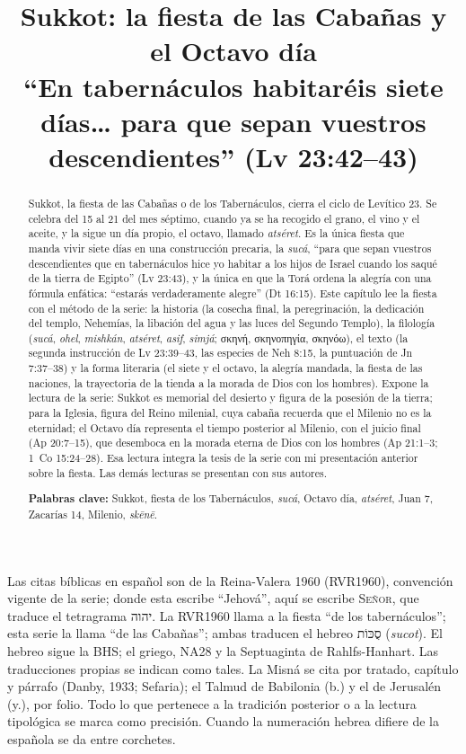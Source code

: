 \documentclass[11pt,letterpaper]{article}
\title{\color{tierraroja}\bfseries Sukkot: la fiesta de las Cabañas y el Octavo día\\[4pt]\large\color{sepia}\mdseries ``En tabernáculos habitaréis siete días\ldots{} para que sepan vuestros descendientes'' (Lv 23:42--43)}
\author{}\date{}
\newcommand{\heb}[1]{\mbox{\foreignlanguage{hebrew}{#1}}}
\newcommand{\grc}[1]{\foreignlanguage{ancientgreek}{#1}}
\newcommand{\SENOR}{\textsc{Señor}}
\begin{document}
\maketitle\thispagestyle{empty}

\begin{abstract}\noindent
Sukkot, la fiesta de las Cabañas o de los Tabernáculos, cierra el ciclo de Levítico 23. Se celebra del 15 al 21 del mes séptimo, cuando ya se ha recogido el grano, el vino y el aceite, y la sigue un día propio, el octavo, llamado \emph{atséret}. Es la única fiesta que manda vivir siete días en una construcción precaria, la \emph{sucá}, ``para que sepan vuestros descendientes que en tabernáculos hice yo habitar a los hijos de Israel cuando los saqué de la tierra de Egipto'' (Lv 23:43), y la única en que la Torá ordena la alegría con una fórmula enfática: ``estarás verdaderamente alegre'' (Dt 16:15). Este capítulo lee la fiesta con el método de la serie: la historia (la cosecha final, la peregrinación, la dedicación del templo, Nehemías, la libación del agua y las luces del Segundo Templo), la filología (\emph{sucá}, \emph{ohel}, \emph{mishkán}, \emph{atséret}, \emph{asif}, \emph{simjá}; \grc{σκηνή}, \grc{σκηνοπηγία}, \grc{σκηνόω}), el texto (la segunda instrucción de Lv 23:39--43, las especies de Neh 8:15, la puntuación de Jn 7:37--38) y la forma literaria (el siete y el octavo, la alegría mandada, la fiesta de las naciones, la trayectoria de la tienda a la morada de Dios con los hombres). Expone la lectura de la serie: Sukkot es memorial del desierto y figura de la posesión de la tierra; para la Iglesia, figura del Reino milenial, cuya cabaña recuerda que el Milenio no es la eternidad; el Octavo día representa el tiempo posterior al Milenio, con el juicio final (Ap 20:7--15), que desemboca en la morada eterna de Dios con los hombres (Ap 21:1--3; 1~Co 15:24--28). Esa lectura integra la tesis de la serie con mi presentación anterior sobre la fiesta. Las demás lecturas se presentan con sus autores.
\par\smallskip\noindent\textbf{Palabras clave:} Sukkot, fiesta de los Tabernáculos, \emph{sucá}, Octavo día, \emph{atséret}, Juan 7, Zacarías 14, Milenio, \emph{skēnē}.\end{abstract}

\begin{nota}
Las citas bíblicas en español son de la Reina-Valera 1960 (RVR1960), convención vigente de la serie; donde esta escribe ``Jehová'', aquí se escribe \SENOR, que traduce el tetragrama \heb{יהוה}. La RVR1960 llama a la fiesta ``de los tabernáculos''; esta serie la llama ``de las Cabañas''; ambas traducen el hebreo \heb{סֻכּוֹת} (\emph{sucot}). El hebreo sigue la BHS; el griego, NA28 y la Septuaginta de Rahlfs-Hanhart. Las traducciones propias se indican como tales. La Misná se cita por tratado, capítulo y párrafo (Danby, 1933; Sefaria); el Talmud de Babilonia (b.) y el de Jerusalén (y.), por folio. Todo lo que pertenece a la tradición posterior o a la lectura tipológica se marca como precisión. Cuando la numeración hebrea difiere de la española se da entre corchetes.
\end{nota}
\end{document}
